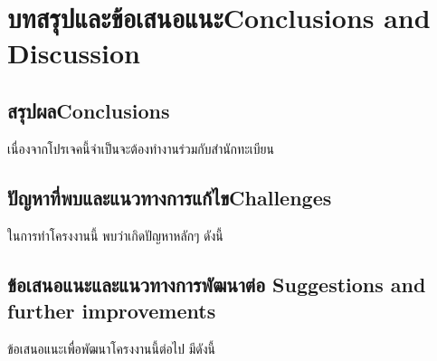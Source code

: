 \chapter{\ifcpe บทสรุปและข้อเสนอแนะ\else Conclusions and Discussion\fi}

\section{\ifcpe สรุปผล\else Conclusions\fi}

เนื่องจากโปรเจคนี้จำเป็นจะต้องทำงานร่วมกับสำนักทะเบียน

\section{\ifcpe ปัญหาที่พบและแนวทางการแก้ไข\else Challenges\fi}

ในการทำโครงงานนี้ พบว่าเกิดปัญหาหลักๆ ดังนี้

\section{\ifcpe%
ข้อเสนอแนะและแนวทางการพัฒนาต่อ
\else%
Suggestions and further improvements
\fi
}

ข้อเสนอแนะเพื่อพัฒนาโครงงานนี้ต่อไป มีดังนี้
